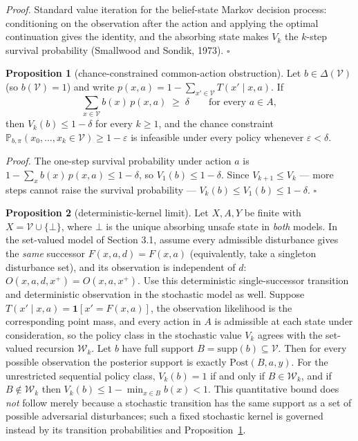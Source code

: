 \documentclass[10pt,twocolumn]{article}
\theoremstyle{definition}
\newtheorem{proposition}{Proposition}
\begin{document}
\emph{Proof.} Standard value iteration for the belief-state Markov decision process: conditioning on the observation after the action and applying the optimal continuation gives the identity, and the absorbing state makes \(V_{k}\) the \(k\)-step survival probability (Smallwood and Sondik, 1973). \hfill\(\square\)

\begin{proposition}[chance-constrained common-action obstruction]\label{calc-prop:chance}
Let \(b \in \Delta(\mathcal{V})\) (so \(b(\mathcal{V}) = 1\)) and write \(p(x,a) = 1 - \sum_{x' \in \mathcal{V}} T(x' \mid x, a)\). If
\[
\sum_{x \in \mathcal{V}} b(x)\, p(x,a) \;\ge\; \delta \qquad \text{for every } a \in A,
\]
then \(V_{k}(b) \le 1 - \delta\) for every \(k \ge 1\), and the chance constraint \(\mathbb{P}_{b,\pi}(x_{0}, \dots, x_{k} \in \mathcal{V}) \ge 1 - \varepsilon\) is infeasible under every policy whenever \(\varepsilon < \delta\).
\end{proposition}

\emph{Proof.} The one-step survival probability under action \(a\) is \(1 - \sum_{x} b(x)\, p(x,a) \le 1 - \delta\), so \(V_{1}(b) \le 1 - \delta\). Since \(V_{k+1} \le V_{k}\) --- more steps cannot raise the survival probability --- \(V_{k}(b) \le V_{1}(b) \le 1 - \delta\). \hfill\(\square\)

\begin{proposition}[deterministic-kernel limit]\label{calc-prop:degenerate}
Let \(X,A,Y\) be finite with \(X=\mathcal V\cup\{\bot\}\), where
\(\bot\) is the unique absorbing unsafe state in \emph{both} models.
In the set-valued model of Section 3.1, assume every admissible
disturbance gives the \emph{same} successor
\(F(x,a,d)=F(x,a)\) (equivalently, take a singleton disturbance set),
and its observation is independent of \(d\):
\(O(x,a,d,x^{+})=O(x,a,x^{+})\). Use this deterministic
single-successor transition and deterministic observation in the
stochastic model as well. Suppose
\(T(x'\mid x,a)=\mathbf{1}[x'=F(x,a)]\), the observation likelihood is
the corresponding point mass, and every action in \(A\) is admissible
at each state under consideration, so the policy class in the stochastic
value \(V_k\) agrees with the set-valued recursion \(\mathcal W_k\).
Let \(b\) have full support \(B=\mathrm{supp}(b)\subseteq\mathcal V\).
Then for every possible observation the posterior support is exactly
\(\mathrm{Post}(B,a,y)\). For the unrestricted sequential policy class,
\(V_k(b)=1\) if and only if \(B\in\mathcal W_k\), and if
\(B\notin\mathcal W_k\) then
\(V_k(b)\le 1-\min_{x\in B}b(x)<1\).
This quantitative bound does \emph{not} follow merely because a
stochastic transition has the same support as a set of possible
adversarial disturbances; such a fixed stochastic kernel is governed
instead by its transition probabilities and Proposition~\ref{calc-prop:chance}.
\end{proposition}
\end{document}
